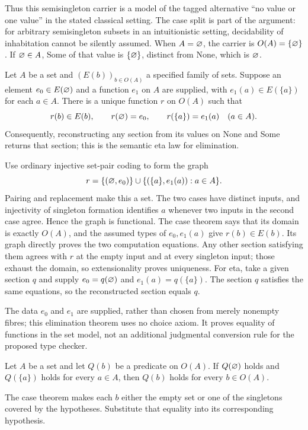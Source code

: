 Thus this semisingleton carrier is a model of the tagged alternative
``no value or one value'' in the stated classical setting. The case
split is part of the argument: for arbitrary semisingleton subsets in
an intuitionistic setting, decidability of inhabitation cannot be
silently assumed. When $A=\varnothing$, the carrier is
$O(A)=\{\varnothing\}$. If $\varnothing\in A$, Some of that value
is $\{\varnothing\}$, distinct from None, which is $\varnothing$.

\begin{theorem}
Let $A$ be a set and $(E(b))_{b\in O(A)}$ a specified family of sets.
Suppose an element $e_0\in E(\varnothing)$ and a function $e_1$ on
$A$ are supplied, with $e_1(a)\in E(\{a\})$ for each $a\in A$.
There is a unique function $r$ on $O(A)$ such that
\[
r(b)\in E(b),\qquad
r(\varnothing)=e_0,\qquad r(\{a\})=e_1(a)\quad(a\in A).
\]
Consequently, reconstructing any section from its values on None and
Some returns that section; this is the semantic eta law for elimination.
\end{theorem}
\Proof
Use ordinary injective set-pair coding to form the graph
\[
r=\{(\varnothing,e_0)\}
  \cup\{(\{a\},e_1(a)):a\in A\}.
\]
Pairing and replacement make this a set. The two cases have distinct
inputs, and injectivity of singleton formation identifies $a$ whenever
two inputs in the second case agree. Hence the graph is functional.
The case theorem says that its domain is exactly $O(A)$, and the
assumed types of $e_0,e_1(a)$ give $r(b)\in E(b)$.
Its graph directly proves the two computation equations. Any other
section satisfying them agrees with $r$ at the empty input and at
every singleton input; those exhaust the domain, so extensionality
proves uniqueness. For eta, take a given section $q$ and supply
$e_0=q(\varnothing)$ and $e_1(a)=q(\{a\})$. The section $q$ satisfies
the same equations, so the reconstructed section equals $q$.
\Done

The data $e_0$ and $e_1$ are supplied, rather than chosen from merely
nonempty fibres; this elimination theorem uses no choice axiom.
It proves equality of functions in the set model, not an additional
judgmental conversion rule for the proposed type checker.

\begin{corollary}
Let $A$ be a set and let $Q(b)$ be a predicate on $O(A)$. If
$Q(\varnothing)$ holds and $Q(\{a\})$ holds for every $a\in A$,
then $Q(b)$ holds for every $b\in O(A)$.
\end{corollary}
\Proof
The case theorem makes each $b$ either the empty set or one of the
singletons covered by the hypotheses. Substitute that equality into
its corresponding hypothesis.
\Done

